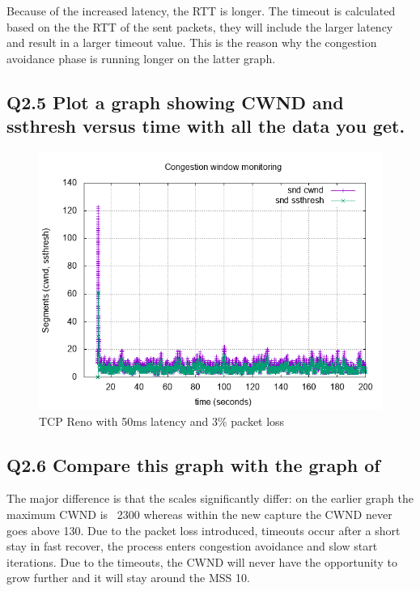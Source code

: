 \documentclass{article}
\begin{document}
Because of the increased latency, the RTT is longer. The timeout is calculated based on the the RTT of the sent packets, they will include the larger latency and result in a larger timeout value. This is the reason why the congestion avoidance phase is running longer on the latter graph.

\newpage

\subsection{Q2.5 Plot a graph showing CWND and ssthresh versus time with
all the data you get.}

\begin{figure}[h]
    \centering
    \includegraphics[scale=0.6]{images/lab1-group11-task2-question5.png}
    \caption{TCP Reno with 50ms latency and 3\% packet loss}
    \label{fig:lab1-group11-task2-question5}
\end{figure}


\subsection{Q2.6 Compare this graph with the graph of}

The major difference is that the scales significantly differ: on the earlier graph the maximum CWND is ~2300 whereas within the new capture the CWND never goes above 130. Due to the packet loss introduced, timeouts occur after a short stay in fast recover, the process enters congestion avoidance and slow start iterations. Due to the timeouts, the CWND will never have the opportunity to grow further and it will stay around the MSS 10.
\end{document}
